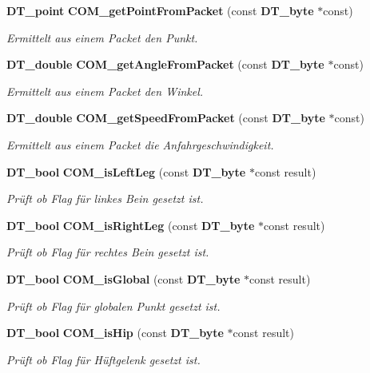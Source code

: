 \begin{DoxyCompactItemize}
{\bf DT\_\-point} {\bf COM\_\-getPointFromPacket} (const {\bf DT\_\-byte} $\ast$const)
\begin{DoxyCompactList}\small\item\em Ermittelt aus einem Packet den Punkt. \item\end{DoxyCompactList}\item 
{\bf DT\_\-double} {\bf COM\_\-getAngleFromPacket} (const {\bf DT\_\-byte} $\ast$const)
\begin{DoxyCompactList}\small\item\em Ermittelt aus einem Packet den Winkel. \item\end{DoxyCompactList}\item 
{\bf DT\_\-double} {\bf COM\_\-getSpeedFromPacket} (const {\bf DT\_\-byte} $\ast$const)
\begin{DoxyCompactList}\small\item\em Ermittelt aus einem Packet die Anfahrgeschwindigkeit. \item\end{DoxyCompactList}\item 
{\bf DT\_\-bool} {\bf COM\_\-isLeftLeg} (const {\bf DT\_\-byte} $\ast$const result)
\begin{DoxyCompactList}\small\item\em Prüft ob Flag für linkes Bein gesetzt ist. \item\end{DoxyCompactList}\item 
{\bf DT\_\-bool} {\bf COM\_\-isRightLeg} (const {\bf DT\_\-byte} $\ast$const result)
\begin{DoxyCompactList}\small\item\em Prüft ob Flag für rechtes Bein gesetzt ist. \item\end{DoxyCompactList}\item 
{\bf DT\_\-bool} {\bf COM\_\-isGlobal} (const {\bf DT\_\-byte} $\ast$const result)
\begin{DoxyCompactList}\small\item\em Prüft ob Flag für globalen Punkt gesetzt ist. \item\end{DoxyCompactList}\item 
{\bf DT\_\-bool} {\bf COM\_\-isHip} (const {\bf DT\_\-byte} $\ast$const result)
\begin{DoxyCompactList}\small\item\em Prüft ob Flag für Hüftgelenk gesetzt ist. \item\end{DoxyCompactList}\item 

\end{DoxyCompactItemize}
